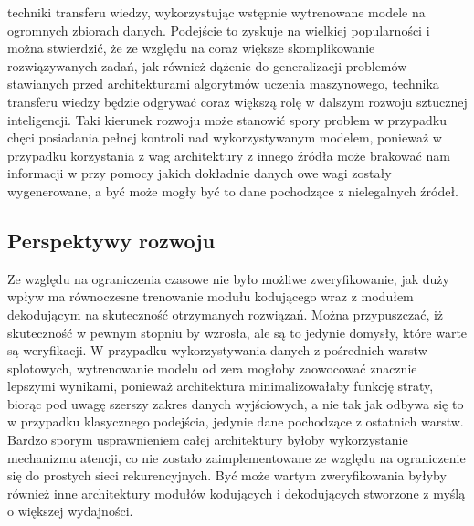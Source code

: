 techniki transferu wiedzy, wykorzystując wstępnie wytrenowane modele na ogromnych zbiorach danych. Podejście to zyskuje na wielkiej popularności i można stwierdzić, że ze względu na coraz większe skomplikowanie rozwiązywanych zadań, jak również dążenie do generalizacji problemów stawianych przed architekturami algorytmów uczenia maszynowego, technika transferu wiedzy będzie odgrywać coraz większą rolę w dalszym rozwoju sztucznej inteligencji. Taki kierunek rozwoju może stanowić spory problem w przypadku chęci posiadania pełnej kontroli nad wykorzystywanym modelem, ponieważ w przypadku korzystania z wag architektury z innego źródła może brakować nam informacji w przy pomocy jakich dokładnie danych owe wagi zostały wygenerowane, a być może mogły być to dane pochodzące z nielegalnych źródeł.
\subsection{Perspektywy rozwoju}
Ze względu na ograniczenia czasowe nie było możliwe zweryfikowanie, jak duży wpływ ma równoczesne trenowanie modułu kodującego wraz z modułem dekodującym na skuteczność otrzymanych rozwiązań. Można przypuszczać, iż skuteczność w pewnym stopniu by wzrosła, ale są to jedynie domysły, które warte są weryfikacji. W przypadku wykorzystywania danych z pośrednich warstw splotowych, wytrenowanie modelu od zera mogłoby zaowocować znacznie lepszymi wynikami, ponieważ architektura minimalizowałaby funkcję straty, biorąc pod uwagę szerszy zakres danych wyjściowych, a nie tak jak odbywa się to w przypadku klasycznego podejścia, jedynie dane pochodzące z ostatnich warstw. Bardzo sporym usprawnieniem całej architektury byłoby wykorzystanie mechanizmu atencji, co nie zostało zaimplementowane ze względu na ograniczenie się do prostych sieci rekurencyjnych. Być może wartym zweryfikowania byłyby również inne architektury modułów kodujących i dekodujących stworzone z myślą o większej wydajności.
